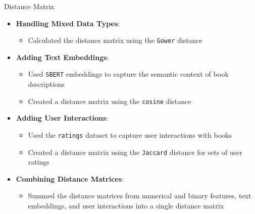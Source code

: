 \documentclass{beamer}
\begin{document}
\begin{frame}{Distance Matrix}
    \begin{itemize}
        \item \textbf{Handling Mixed Data Types}:
            \begin{itemize}
                \item Calculated the distance matrix using the \texttt{Gower} distance
            \end{itemize}
        \item \textbf{Adding Text Embeddings}:
            \begin{itemize}
                \item Used \texttt{SBERT} embeddings to capture the semantic context of book descriptions
                \item Created a distance matrix using the \texttt{cosine} distance
            \end{itemize}
        \item \textbf{Adding User Interactions}:
            \begin{itemize}
                \item Used the \texttt{ratings} dataset to capture user interactions with books
                \item Created a distance matrix using the \texttt{Jaccard} distance for sets of user ratings
            \end{itemize}
        \item \textbf{Combining Distance Matrices}:
            \begin{itemize}
                \item Summed the distance matrices from numerical and binary features, text embeddings, and user interactions into a single distance matrix
            \end{itemize}
    \end{itemize}
\end{frame}
\end{document}
